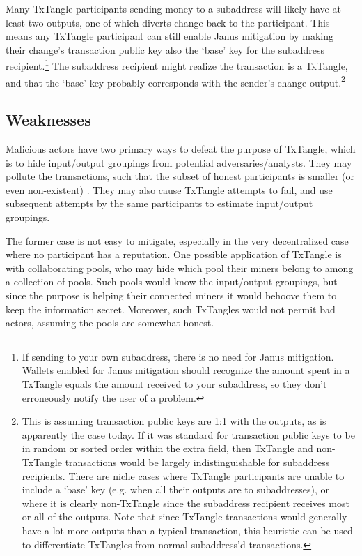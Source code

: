 Many TxTangle participants sending money to a subaddress will likely have at least two outputs, one of which diverts change back to the participant. This means any TxTangle participant can still enable Janus mitigation by making their change's transaction public key also the `base' key for the subaddress recipient.\footnote{If sending to your own subaddress, there is no need for Janus mitigation. Wallets enabled for Janus mitigation should recognize the amount spent in a TxTangle equals the amount received to your subaddress, so they don't erroneously notify the user of a problem.} The subaddress recipient might realize the transaction is a TxTangle, and that the `base' key probably corresponds with the sender's change output.\footnote{This is assuming transaction public keys are 1:1 with the outputs, as is apparently the case today. If it was standard for transaction public keys to be in random or sorted order within the extra field, then TxTangle and non-TxTangle transactions would be largely indistinguishable for subaddress recipients. There are niche cases where TxTangle participants are unable to include a `base' key (e.g. when all their outputs are to subaddresses), or where it is clearly non-TxTangle since the subaddress recipient receives most or all of the outputs. Note that since TxTangle transactions would generally have a lot more outputs than a typical transaction, this heuristic can be used to differentiate TxTangles from normal subaddress'd transactions.}


\subsection{Weaknesses}
\label{subsec:weaknesses-txtangle}

Malicious actors have two primary ways to defeat the purpose of TxTangle, which is to hide input/output groupings from potential adversaries/analysts. They may pollute the transactions, such that the subset of honest participants is smaller (or even non-existent) \cite{coinjoin-pollution}. They may also cause TxTangle attempts to fail, and use subsequent attempts by the same participants to estimate input/output groupings.

The former case is not easy to mitigate, especially in the very decentralized case where no participant has a reputation. One possible application of TxTangle is with collaborating pools, who may hide which pool their miners belong to among a collection of pools. Such pools would know the input/output groupings, but since the purpose is helping their connected miners it would behoove them to keep the information secret. Moreover, such TxTangles would not permit bad actors, assuming the pools are somewhat honest.

